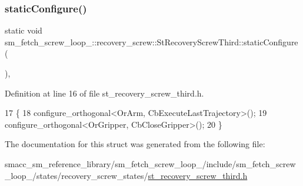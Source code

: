 \subsubsection{\texorpdfstring{static\+Configure()}{staticConfigure()}}
{\footnotesize\ttfamily static void sm\+\_\+fetch\+\_\+screw\+\_\+loop\+\_\+::recovery\+\_\+screw\+::\+St\+Recovery\+Screw\+Third\+::static\+Configure (\begin{DoxyParamCaption}{ }\end{DoxyParamCaption})\hspace{0.3cm}{\ttfamily [inline]}, {\ttfamily [static]}}



Definition at line 16 of file st\+\_\+recovery\+\_\+screw\+\_\+third.\+h.


\begin{DoxyCode}
17             \{
18                 configure\_orthogonal<OrArm, CbExecuteLastTrajectory>();
19                 configure\_orthogonal<OrGripper, CbCloseGripper>();
20             \}
\end{DoxyCode}


The documentation for this struct was generated from the following file\+:\begin{DoxyCompactItemize}
\item 
smacc\+\_\+sm\+\_\+reference\+\_\+library/sm\+\_\+fetch\+\_\+screw\+\_\+loop\+\_/include/sm\+\_\+fetch\+\_\+screw\+\_\+loop\+\_/states/recovery\+\_\+screw\+\_\+states/\hyperlink{sm__fetch__screw__loop__1_2include_2sm__fetch__screw__loop__1_2states_2recovery__screw__states_2st__recovery__screw__third_8h}{st\+\_\+recovery\+\_\+screw\+\_\+third.\+h}\end{DoxyCompactItemize}
